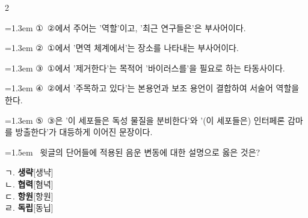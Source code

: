 \documentclass[10pt, a4paper]{article}
\begin{document}
\begin{multicols}{2}
\begin{minipage}{\columnwidth}
\vspace{0.5mm}
{\hangindent=1.3em  \noindent\hspace{0.3em}①~②에서 주어는 '역할'이고, '최근 연구들은'은 부사어이다.\par}
{\hangindent=1.3em  \noindent\hspace{0.3em}②~①에서 '면역 체계에서'는 장소를 나타내는 부사어이다.\par}
{\hangindent=1.3em  \noindent\hspace{0.3em}③~①에서 '제거한다'는 목적어 '바이러스를'을 필요로 하는 타동사이다.\par}
{\hangindent=1.3em  \noindent\hspace{0.3em}④~②에서 '주목하고 있다'는 본용언과 보조 용언이 결합하여 서술어 역할을 한다.\par}
{\hangindent=1.3em  \noindent\hspace{0.3em}⑤~③은 '이 세포들은 독성 물질을 분비한다'와 '(이 세포들은) 인터페론 감마를 방출한다'가 대등하게 이어진 문장이다.\par}
\vspace{4mm}
\end{minipage}
\par

\noindent\begin{minipage}{\columnwidth}
\vspace{2mm}
{\hangindent=1.5em  ~윗글의 단어들에 적용된 음운 변동에 대한 설명으로 옳은 것은?\par}

\vspace{1mm}
\begin{boxibox}
ㄱ. \textbf{생략}[생냑] \\
ㄴ. \textbf{협력}[혐녁] \\
ㄷ. \textbf{항원}[항원] \\
ㄹ. \textbf{독립}[동닙] \\
\end{boxibox}
\vspace{1mm}


\end{minipage}
\end{multicols}
\end{document}
